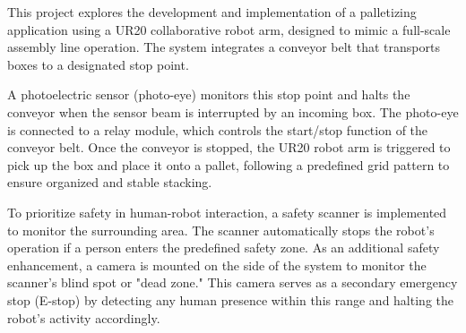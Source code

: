 This project explores the development and implementation of a palletizing application using a UR20 collaborative robot arm, designed to mimic a full-scale assembly line operation. The system integrates a conveyor belt that transports boxes to a designated stop point. 

A photoelectric sensor (photo-eye) monitors this stop point and halts the conveyor when the sensor beam is interrupted by an incoming box. The photo-eye is connected to a relay module, which controls the start/stop function of the conveyor belt. Once the conveyor is stopped, the UR20 robot arm is triggered to pick up the box and place it onto a pallet, following a predefined grid pattern to ensure organized and stable stacking. 

To prioritize safety in human-robot interaction, a safety scanner is implemented to monitor the surrounding area. The scanner automatically stops the robot’s operation if a person enters the predefined safety zone. As an additional safety enhancement, a camera is mounted on the side of the system to monitor the scanner’s blind spot or "dead zone." This camera serves as a secondary emergency stop (E-stop) by detecting any human presence within this range and halting the robot's activity accordingly.


